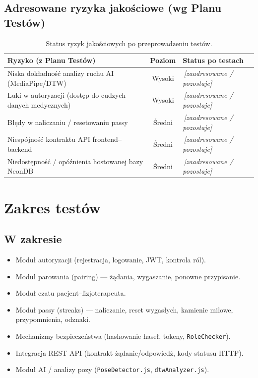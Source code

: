 \documentclass[11pt,a4paper]{article}
\newcommand{\luka}[1]{\colorbox{lukacol}{\,\textit{[#1]}\,}}
\begin{document}
\subsection{Adresowane ryzyka jakościowe (wg Planu Testów)}
\begin{table}[h]
\centering
\begin{tabularx}{\textwidth}{Y c Y}
\toprule
\textbf{Ryzyko (z Planu Testów)} & \textbf{Poziom} & \textbf{Status po testach} \\
\midrule
Niska dokładność analizy ruchu AI (MediaPipe/DTW) & \textcolor{riskhigh}{Wysoki} & \luka{zaadresowane / pozostaje} \\
Luki w autoryzacji (dostęp do cudzych danych medycznych) & \textcolor{riskhigh}{Wysoki} & \luka{zaadresowane / pozostaje} \\
Błędy w naliczaniu / resetowaniu passy & \textcolor{riskmed}{Średni} & \luka{zaadresowane / pozostaje} \\
Niespójność kontraktu API frontend–backend & \textcolor{riskmed}{Średni} & \luka{zaadresowane / pozostaje} \\
Niedostępność / opóźnienia hostowanej bazy NeonDB & \textcolor{riskmed}{Średni} & \luka{zaadresowane / pozostaje} \\
\bottomrule
\end{tabularx}
\caption{Status ryzyk jakościowych po przeprowadzeniu testów.}
\end{table}

\section{Zakres testów}

\subsection{W zakresie}
\begin{itemize}
  \item Moduł autoryzacji (rejestracja, logowanie, JWT, kontrola ról).
  \item Moduł parowania (pairing) — żądania, wygaszanie, ponowne przypisanie.
  \item Moduł czatu pacjent–fizjoterapeuta.
  \item Moduł passy (streaks) — naliczanie, reset wygasłych, kamienie milowe, przypomnienia, odznaki.
  \item Mechanizmy bezpieczeństwa (hashowanie haseł, tokeny, \texttt{RoleChecker}).
  \item Integracja REST API (kontrakt żądanie/odpowiedź, kody statusu HTTP).
  \item Moduł AI / analizy pozy (\texttt{PoseDetector.js}, \texttt{dtwAnalyzer.js}).
\end{itemize}
\end{document}
